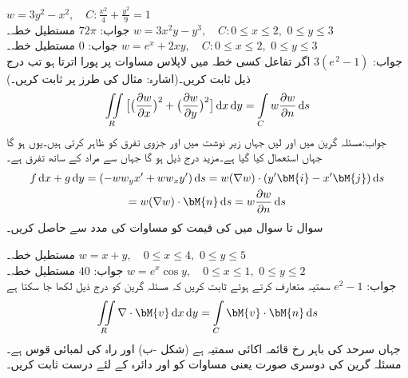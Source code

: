  \quad
$w=3y^2-x^2,\quad C:\tfrac{x^2}{4}+\tfrac{y^2}{9}=1$\\
جواب:\quad
$72\pi$
 \quad مستطیل خطہ۔\quad
$w=3x^2y-y^3,\quad C:0\le x\le 2,\,\, 0\le y\le 3$\\
جواب:\quad
$0$
 \quad مستطیل خطہ۔\quad
$w=e^x+2xy,\quad C:0\le x\le 2,\,\, 0\le y\le 3$\\
جواب:\quad
$3(e^{\,2}-1)$
\quad اگر تفاعل  کسی خطہ  میں لاپلاس مساوات  پر پورا اترتا ہو تب درج ذیل ثابت کریں۔(اشارہ: مثال  کی طرز پر ثابت کریں۔) 
\begin{align}\label{مساوات_خطی_تکمل_لاپلاسی_تعلق_ب}
\iint\limits_R \big[\big(\frac{\partial w}{\partial x}\big)^2+\big(\frac{\partial w}{\partial y}\big)^2\big]\dif x\dif y=\int\limits_C w\frac{\partial w}{\partial n}\dif s
\end{align}
جواب:مسئلہ گرین میں  اور  لیں جہاں زیر نوشت میں  اور  جزوی تفرق کو ظاہر کرتی ہیں۔یوں 
 ہو گا جہاں  استعمال کیا گیا ہے۔مزید درج ذیل ہو گا جہاں  سے مراد  کے ساتھ تفرق ہے۔
\begin{multline*}
f\dif x+g\dif y=(-ww_yx'+ww_xy')\dif s=w(\nabla w)\cdot (y'\bM{i}-x'\bM{j})\dif s\\
=w(\nabla w)\cdot \bM{n}\dif s=w\frac{\partial w}{\partial n}\dif s
\end{multline*}
سوال  تا سوال  میں  کی قیمت کو مساوات  کی مدد سے حاصل کریں۔

\quad مستطیل خطہ۔
$w=x+y,\quad 0\le x\le 4,\,\, 0 \le y \le 5$\\
جواب:\quad
$40$
\quad مستطیل خطہ۔
$w=e^x\cos y,\quad 0\le x\le 1,\,\, 0 \le y \le 2$\\
جواب:\quad
$e^2-1$
\quad
سمتیہ  متعارف کرتے ہوئے ثابت کریں کہ مسئلہ گرین  کو درج ذیل لکھا جا سکتا ہے
\begin{align}\label{مساوات_خطی_تکمل_مسئلہ_گرین_دوسری_صورت}
\iint\limits_R \nabla \cdot \bM{v}\dif x\dif y=\int\limits_C \bM{v}\cdot \bM{n}\dif s
\end{align}
جہاں  سرحد کی باہر رخ قائمہ اکائی سمتیہ ہے (شکل -ب)  اور  راہ  کی لمبائی قوس ہے۔ 
مسئلہ گرین کی دوسری صورت یعنی مساوات  کو  اور دائرہ  کے لئے درست ثابت کریں۔


